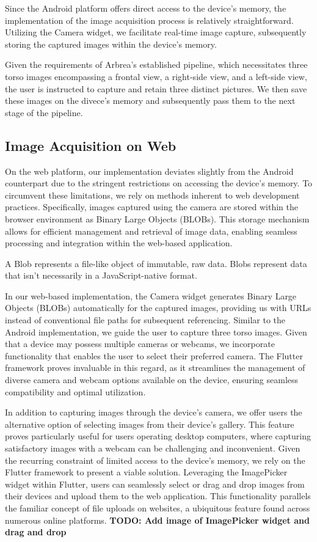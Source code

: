 Since the Android platform offers direct access to the device's memory, the implementation of the image acquisition process is relatively straightforward. 
Utilizing the Camera widget, we facilitate real-time image capture, subsequently storing the captured images within the device's memory. 

Given the requirements of Arbrea's established pipeline, 
which necessitates three torso images encompassing a frontal view, a right-side view, and a left-side view, the user is instructed to capture and retain three distinct pictures. 
We then save these images on the divece's memory and subsequently pass them to the next stage of the pipeline.

\subsection{Image Acquisition on Web}

On the web platform, our implementation deviates slightly from the Android counterpart due to the stringent restrictions on accessing the device's memory. 
To circumvent these limitations, we rely on methods inherent to web development practices. Specifically, images captured using the camera are stored within the browser environment as Binary Large Objects (BLOBs). 
This storage mechanism allows for efficient management and retrieval of image data, enabling seamless processing and integration within the web-based application.

A Blob represents a file-like object of immutable, raw data. Blobs represent data that isn't necessarily in a JavaScript-native format. 

In our web-based implementation, the Camera widget generates Binary Large Objects (BLOBs) automatically for the captured images, providing us with URLs instead of conventional file paths for subsequent referencing. 
Similar to the Android implementation, we guide the user to capture three torso images. Given that a device may possess multiple cameras or webcams, we incorporate functionality that enables the user 
to select their preferred camera. The Flutter framework proves invaluable in this regard, as it streamlines the management of diverse camera and webcam options available on the device, 
ensuring seamless compatibility and optimal utilization.

In addition to capturing images through the device's camera, we offer users the alternative option of selecting images from their device's gallery. This feature proves particularly useful 
for users operating desktop computers, where capturing satisfactory images with a webcam can be challenging and inconvenient. Given the recurring constraint of limited access to the device's memory, 
we rely on the Flutter framework to present a viable solution. Leveraging the ImagePicker widget within Flutter, users can seamlessly select or drag and drop images from their devices 
and upload them to the web application. This functionality parallels the familiar concept of file uploads on websites, a ubiquitous feature found across numerous online platforms. 
\textbf{TODO: Add image of ImagePicker widget and drag and drop}

